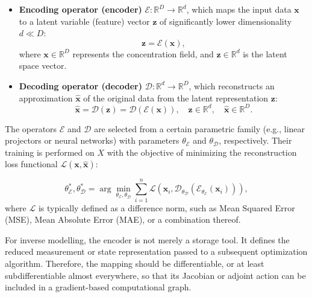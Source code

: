 \documentclass[pdflatex,sn-mathphys-num]{sn-jnl}%
\theoremstyle{thmstyleone}%
\theoremstyle{thmstyletwo}%
\theoremstyle{thmstylethree}%
\begin{document}
\begin{itemize}
    \item \textbf{Encoding operator (encoder)} $\mathcal{E}: \mathbb{R}^{D} \rightarrow \mathbb{R}^{d}$, which maps the input data $\mathbf{x}$ to a latent variable (feature) vector $\mathbf{z}$ of significantly lower dimensionality $d \ll D$:
    \begin{equation}
        \mathbf{z} = \mathcal{E}(\mathbf{x}),
    \end{equation}
    where $\mathbf{x} \in \mathbb{R}^{D}$ represents the concentration field, and $\mathbf{z} \in \mathbb{R}^{d}$ is the latent space vector.

    \item \textbf{Decoding operator (decoder)} $\mathcal{D}: \mathbb{R}^{d} \rightarrow \mathbb{R}^{D}$, which reconstructs an approximation $\hat{\mathbf{x}}$ of the original data from the latent representation $\mathbf{z}$:
    \begin{equation}
        \hat{\mathbf{x}} = \mathcal{D}(\mathbf{z}) = \mathcal{D}(\mathcal{E}(\mathbf{x})), \quad \mathbf{z} \in \mathbb{R}^{d}, \quad \hat{\mathbf{x}} \in \mathbb{R}^{D}.
    \end{equation}
\end{itemize}


The operators $\mathcal{E}$ and $\mathcal{D}$ are selected from a certain parametric family (e.g., linear projectors or neural networks) with parameters $\theta_{\mathcal{E}}$ and $\theta_{\mathcal{D}}$, respectively. Their training is performed on $X$ with the objective of minimizing the reconstruction loss functional $\mathcal{L}(\mathbf{x}, \hat{\mathbf{x}})$:

\begin{equation}
    \theta_{\mathcal{E}}^{*}, \theta_{\mathcal{D}}^{*} = \arg \min_{\theta_{\mathcal{E}}, \theta_{\mathcal{D}}} \sum_{i=1}^{n} \mathcal{L}(\mathbf{x}_i, \mathcal{D}_{\theta_{\mathcal{D}}}(\mathcal{E}_{\theta_{\mathcal{E}}}(\mathbf{x}_i))),
\end{equation}
where $\mathcal{L}$ is typically defined as a difference norm, such as Mean Squared Error (MSE), Mean Absolute Error (MAE), or a combination thereof.


For inverse modelling, the encoder is not merely a storage tool. It defines the reduced measurement or state representation passed to a subsequent optimization algorithm. Therefore, the mapping should be differentiable, or at least subdifferentiable almost everywhere, so that its Jacobian or adjoint action can be included in a gradient-based computational graph.
\end{document}
